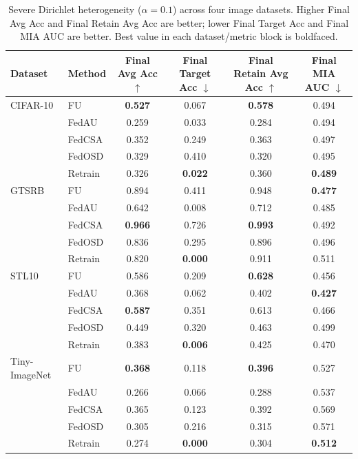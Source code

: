 \begin{table}[t]
\centering
\caption{Severe Dirichlet heterogeneity ($\alpha=0.1$) across four image datasets. Higher Final Avg Acc and Final Retain Avg Acc are better; lower Final Target Acc and Final MIA AUC are better. Best value in each dataset/metric block is boldfaced.}
\label{tab:severe_cross_dataset_main}
\begin{tabular}{llcccc}
\toprule
Dataset & Method & Final Avg Acc $\uparrow$ & Final Target Acc $\downarrow$ & Final Retain Avg Acc $\uparrow$ & Final MIA AUC $\downarrow$ \\
\midrule
CIFAR-10 & FU & \textbf{0.527} & 0.067 & \textbf{0.578} & 0.494 \\
 & FedAU & 0.259 & 0.033 & 0.284 & 0.494 \\
 & FedCSA & 0.352 & 0.249 & 0.363 & 0.497 \\
 & FedOSD & 0.329 & 0.410 & 0.320 & 0.495 \\
 & Retrain & 0.326 & \textbf{0.022} & 0.360 & \textbf{0.489} \\
\midrule
GTSRB & FU & 0.894 & 0.411 & 0.948 & \textbf{0.477} \\
 & FedAU & 0.642 & 0.008 & 0.712 & 0.485 \\
 & FedCSA & \textbf{0.966} & 0.726 & \textbf{0.993} & 0.492 \\
 & FedOSD & 0.836 & 0.295 & 0.896 & 0.496 \\
 & Retrain & 0.820 & \textbf{0.000} & 0.911 & 0.511 \\
\midrule
STL10 & FU & 0.586 & 0.209 & \textbf{0.628} & 0.456 \\
 & FedAU & 0.368 & 0.062 & 0.402 & \textbf{0.427} \\
 & FedCSA & \textbf{0.587} & 0.351 & 0.613 & 0.466 \\
 & FedOSD & 0.449 & 0.320 & 0.463 & 0.499 \\
 & Retrain & 0.383 & \textbf{0.006} & 0.425 & 0.470 \\
\midrule
Tiny-ImageNet & FU & \textbf{0.368} & 0.118 & \textbf{0.396} & 0.527 \\
 & FedAU & 0.266 & 0.066 & 0.288 & 0.537 \\
 & FedCSA & 0.365 & 0.123 & 0.392 & 0.569 \\
 & FedOSD & 0.305 & 0.216 & 0.315 & 0.571 \\
 & Retrain & 0.274 & \textbf{0.000} & 0.304 & \textbf{0.512} \\
\bottomrule
\end{tabular}
\end{table}
